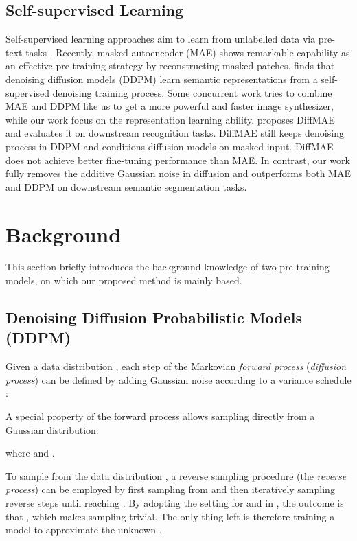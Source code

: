 \documentclass{article} \usepackage{iclr2024_conference,times}
\begin{document}
\subsection{Self-supervised Learning}
Self-supervised learning approaches aim to learn from unlabelled data via pre-text tasks \citep{DBLP:conf/iccv/DoerschGE15,DBLP:conf/iccv/WangG15,DBLP:conf/cvpr/PathakGDDH17,DBLP:conf/iclr/GidarisSK18}. Recently, masked autoencoder (MAE) \citep{DBLP:conf/cvpr/HeCXLDG22} shows remarkable capability as an effective pre-training strategy by reconstructing masked patches. \citet{DBLP:conf/iclr/BaranchukVRKB22} finds that denoising diffusion models (DDPM) learn semantic representations from a self-supervised denoising training process. Some concurrent work \citep{lei2023masked} tries to combine MAE and DDPM like us to get a more powerful and faster image synthesizer, while our work focus on the representation learning ability. \citet{wei2023diffusion} proposes DiffMAE and evaluates it on downstream recognition tasks. DiffMAE still keeps denoising process in DDPM and conditions diffusion models on masked input. DiffMAE does not achieve better fine-tuning performance than MAE. In contrast, our work fully removes the additive Gaussian noise in diffusion and outperforms both MAE and DDPM on downstream semantic segmentation tasks.

\section{Background}
This section briefly introduces the background knowledge of two pre-training models, on which our proposed method is mainly based. 

\subsection{Denoising Diffusion Probabilistic Models (DDPM)}

Given a data distribution , each step of the Markovian \emph{forward process} (\emph{diffusion process}) can be defined by adding Gaussian noise according to a variance schedule :

A special property of the forward process allows sampling  directly from a Gaussian distribution:

where  and .

To sample from the data distribution , a reverse sampling procedure (the \emph{reverse process}) can be employed by first sampling from  and then iteratively sampling reverse steps  until reaching . By adopting the setting for  and  in \citet{DBLP:conf/nips/HoJA20}, the outcome is that , which makes sampling  trivial. The only thing left is therefore training a model  to approximate the unknown . 
\end{document}
